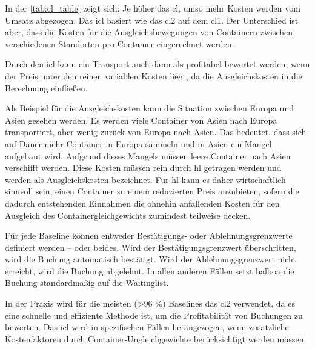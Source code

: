 In der \cref{tab:cl_table} zeigt sich: Je höher das \gls{cl}, umso mehr Kosten werden vom Umsatz abgezogen.
Das \gls{icl} basiert wie das \gls{cl}2 auf dem \gls{cl}1. Der Unterschied ist aber, dass die Kosten für die Ausgleichsbewegungen von Containern zwischen verschiedenen Standorten pro Container eingerechnet werden. 

Durch den \gls{icl} kann ein Transport auch dann als profitabel bewertet werden, wenn der Preis unter den reinen variablen Kosten liegt, da die Ausgleichskosten in die Berechnung einfließen.

Als Beispiel für die Ausgleichskosten kann die Situation zwischen Europa und Asien gesehen werden. 
Es werden viele Container von Asien nach Europa transportiert, aber wenig zurück von Europa nach Asien. 
Das bedeutet, dass sich auf Dauer mehr Container in Europa sammeln und in Asien ein Mangel aufgebaut wird. 
Aufgrund dieses Mangels müssen leere Container nach Asien verschifft werden. Diese Kosten müssen rein durch \gls{hl} getragen werden und werden als Ausgleichskosten bezeichnet. Für \gls{hl} kann es daher wirtschaftlich sinnvoll sein, einen Container zu einem reduzierten Preis anzubieten, sofern die dadurch entstehenden Einnahmen die ohnehin anfallenden Kosten für den Ausgleich des Containergleichgewichts zumindest teilweise decken.




Für jede Baseline können entweder Bestätigungs- oder Ablehnungsgrenzwerte definiert werden – oder beides. Wird der Bestätigungsgrenzwert überschritten, wird die Buchung automatisch bestätigt. Wird der Ablehnungsgrenzwert nicht erreicht, wird die Buchung abgelehnt. In allen anderen Fällen setzt \gls{balboa} die Buchung standardmäßig auf die Waitinglist.

In der Praxis wird für die meisten (>96 \%) Baselines das \gls{cl}2 verwendet, da es eine schnelle und effiziente Methode ist, um die Profitabilität von Buchungen zu bewerten. Das \gls{icl} wird in spezifischen Fällen herangezogen, wenn zusätzliche Kostenfaktoren durch Container-Ungleichgewichte berücksichtigt werden müssen.

